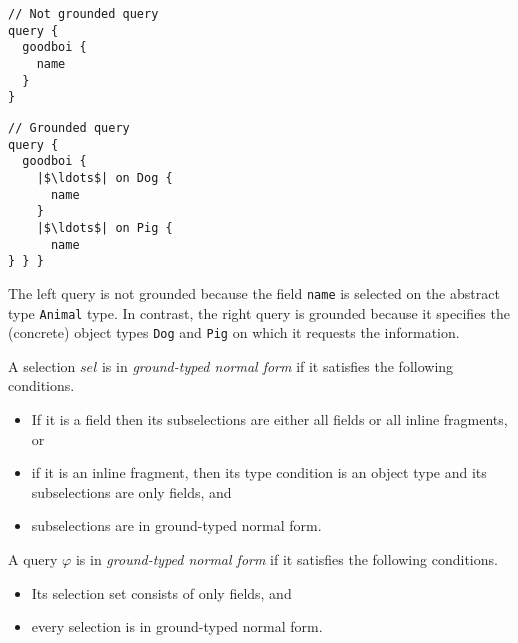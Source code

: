 \begin{minipage}[t]{.25\textwidth}
\begin{verbatim}
// Not grounded query
query {
  goodboi {
    name
  }
}
\end{verbatim}
\end{minipage}%
\begin{minipage}[t]{.25\textwidth}
\begin{verbatim}
// Grounded query
query {
  goodboi {
    |$\ldots$| on Dog {
	  name
    }
    |$\ldots$| on Pig {
      name
} } }
\end{verbatim} 
\end{minipage}
The left query is not grounded because the field \texttt{name} is selected on the abstract type \texttt{Animal} type. In contrast, the right query is grounded because it specifies the (concrete) object types \texttt{Dog} and \texttt{Pig} on which it requests the information.
\begin{definition}
A \gql selection $sel$ is in \textit{ground-typed normal form} if it satisfies the following conditions. %
\begin{itemize}
	\item If it is a field then its subselections are either all fields or all inline fragments, or
	\item if it is an inline fragment, then its type condition is an object type and its subselections are only fields, and
	\item subselections are in ground-typed normal form.
\end{itemize}
\end{definition}

\begin{definition}
A \gql query $\varphi$ is in \textit{ground-typed normal form} if it satisfies the following conditions. %
\begin{itemize}
	\item Its selection set consists of only fields, and
	\item every selection is in ground-typed normal form.
\end{itemize}
\end{definition}

